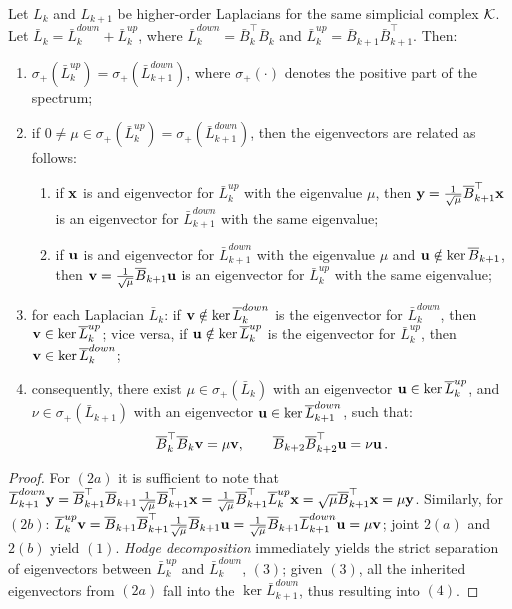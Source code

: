 \begin{theorem}\label{thm:inherit}
  Let $L_k$ and $L_{k+1}$ be  higher-order Laplacians for the same simplicial complex $\mathcal{K}$. Let $\bar L_k=\bar L_k^{down}+\bar L_k^{up}$, where $\bar L_k^{down}=\bar B_k^\top \bar B_k$ and $\bar L_k^{up}=\bar B_{k+1} \bar B_{k+1}^\top$. Then:
  \begin{enumerate}
    \item $\sigma_+(\bar L_k^{up})=\sigma_+(\bar L_{k+1}^{down})$, where $\sigma_+(\cdot)$ denotes the positive part of the spectrum;
    \item if $ 0 \ne \mu \in \sigma_+(\bar L_k^{up}) = \sigma_+(\bar L_{k+1}^{down})$, then the eigenvectors are related as follows:
    \begin{enumerate}
      \item if $\mathbf{x}$ is and eigenvector for $\bar L_k^{up}$ with the eigenvalue $\mu$, then $\mathbf{y} = \frac{1}{\sqrt{\mu}} \overline{B}_{k+1}^\top \mathbf{x}$ is an eigenvector for $\bar L_{k+1}^{down}$ with the same eigenvalue;
      \item if $\mathbf{u}$ is and eigenvector for $\bar L_{k+1}^{down}$ with the eigenvalue $\mu$ and $\mathbf{u} \notin \ker \overline{B}_{k+1}$, then $\mathbf{v} = \frac{1}{\sqrt{\mu}} \overline{B}_{k+1} \mathbf{u}$ is an eigenvector for $\bar L_{k}^{up}$ with the same eigenvalue;
    \end{enumerate}
    \item for each Laplacian $\bar L_k$: if $\mathbf{v} \notin \ker \overline{L}_k^{down}$ is the eigenvector for $\bar L_k^{down}$, then $\mathbf{v} \in \ker \overline{L}_{k}^{up}$; vice versa, if $\mathbf{u} \notin \ker \overline{L}_k^{up}$ is the eigenvector for $\bar L_k^{up}$, then $\mathbf{v} \in \ker \overline{L}_k^{down}$;
    \item consequently, there exist $\mu \in \sigma_+(\bar L_k)$ with an eigenvector $\mathbf{u} \in \ker \overline{L}_k^{up}$, and $\nu \in \sigma_+(\bar L_{k+1})$ with an eigenvector $\mathbf{u} \in \ker \overline{L}_{k+1}^{down}$, such that:
    $$
    \overline{B}_k^\top \overline{B}_k \mathbf{v}  = \mu \mathbf{v}, \qquad \overline{B}_{k+2} \overline{B}_{k+2}^\top \mathbf{u} = \nu \mathbf{u}\, . 
    $$
  \end{enumerate}
\end{theorem}
\begin{proof}
For $(2a)$ it is sufficient to note that $ \overline{L}_{k+1}^{down} \mathbf{y} = \overline{B}_{k+1}^\top \overline{B}_{k+1} \frac{1}{\sqrt{\mu}} \overline{B}_{k+1}^\top \mathbf{x} = \frac{1}{\sqrt{\mu}}\overline{B}_{k+1}^\top \overline{L}_k^{up} \mathbf{x} = \sqrt \mu \overline{B}_{k+1}^\top \mathbf{x}  = \mu \mathbf{y}$. Similarly, for $(2b)$: $\overline{L}_k^{up} \mathbf{v}= \overline{B}_{k+1} \overline{B}_{k+1}^\top \frac{1}{\sqrt{\mu}} \overline{B}_{k+1} \mathbf{u} = \frac{1}{\sqrt{\mu}} \overline{B}_{k+1} \overline{L}_{k+1}^{down} \mathbf{u} = \mu \mathbf{v} $; joint $2(a)$ and $2(b)$ yield $(1)$. \emph{Hodge decomposition} immediately yields the strict separation of eigenvectors between $\bar L_k^{up}$ and $\bar L_k^{down}$, $(3)$; given $(3)$, all the inherited  eigenvectors from $(2a)$ fall into the $\ker \bar L_{k+1}^{down}$, thus resulting into $(4)$.
\end{proof}
